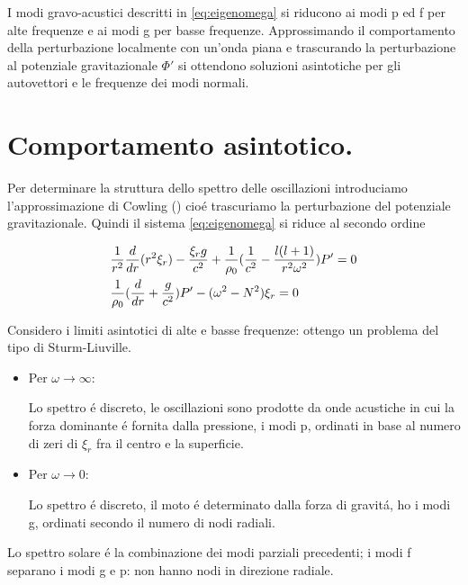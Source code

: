 \documentclass[../main.tex]{subfiles}
\begin{document}

I modi gravo-acustici descritti in \eqref{eq:eigenomega} si riducono ai modi p ed f per alte frequenze e ai modi g per basse frequenze. Approssimando il comportamento della perturbazione localmente con un'onda piana e trascurando la perturbazione al potenziale gravitazionale $\Phi'$ si ottendono soluzioni asintotiche per gli autovettori e le frequenze dei modi normali.

\section{Comportamento asintotico.}

Per determinare la struttura dello spettro delle oscillazioni introduciamo l'approssimazione di Cowling (\cite{cow41oscillations}) cio\'e trascuriamo la perturbazione del potenziale gravitazionale. Quindi il sistema \eqref{eq:eigenomega} si riduce al secondo ordine

\begin{align}
&\frac{1}{r^2}\frac{d}{d r}(r^2\xi_r)-\frac{\xi_rg}{c^2}+\frac{1}{\rho_0}(\frac{1}{c^2}-\frac{l(l+1)}{r^2\omega^2})P'=0\label{eq:cowosc}\\
&\frac{1}{\rho_0}(\frac{d}{d r}+\frac{g}{c^2})P'-(\omega^2-N^2)\xi_r=0\nonumber
\end{align}

Considero i limiti asintotici di alte e basse frequenze: ottengo un problema del tipo di Sturm-Liuville.

\begin{itemize}
\item Per $\omega\to\infty$:

Lo spettro \'e discreto, le oscillazioni sono prodotte da onde acustiche in cui la forza dominante \'e fornita dalla pressione, i modi p, ordinati in base al numero di zeri di $\xi_r$ fra il centro e la superficie.

\item Per $\omega\to0$:

Lo spettro \'e discreto, il moto \'e determinato dalla forza di gravit\'a, ho i modi g, ordinati secondo il numero di nodi radiali.

\end{itemize}

Lo spettro solare \'e la combinazione dei modi parziali precedenti; i modi f separano i modi g e p: non hanno nodi in direzione radiale.
\end{document}
